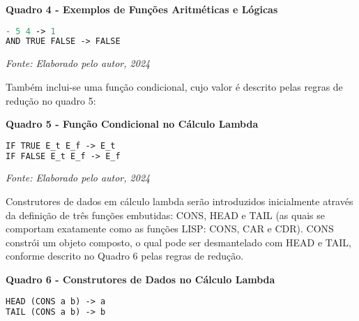 \begin{center}
    \textbf{Quadro 4 - Exemplos de Funções Aritméticas e Lógicas}
\end{center}


\begin{tcolorbox}[colback=gray!5!white, colframe=gray!75!black, title=]
\begin{lstlisting}[language=Lisp]
- 5 4 -> 1
AND TRUE FALSE -> FALSE
\end{lstlisting}
\end{tcolorbox}

\begin{center}
    \textit{Fonte: Elaborado pelo autor, 2024} %
\end{center}

Também inclui-se uma função condicional, cujo valor é descrito pelas regras de redução no quadro 5:

\begin{center}
    \textbf{Quadro 5 - Função Condicional no Cálculo Lambda}
\end{center}

\begin{tcolorbox}[colback=gray!5!white, colframe=gray!75!black, title=]
\begin{lstlisting}[language=Lisp]
IF TRUE E_t E_f -> E_t
IF FALSE E_t E_f -> E_f
\end{lstlisting}
\end{tcolorbox}

\begin{center}
    \textit{Fonte: Elaborado pelo autor, 2024} %
\end{center}


Construtores de dados em cálculo lambda serão introduzidos inicialmente através da definição de três funções embutidas: CONS, HEAD e TAIL (as quais se comportam exatamente como as funções LISP: CONS, CAR e CDR). CONS constrói um objeto composto, o qual pode ser desmantelado com HEAD e TAIL, conforme descrito no Quadro 6 pelas regras de redução.

\begin{center}
    \textbf{Quadro 6 - Construtores de Dados no Cálculo Lambda}
\end{center}

\begin{tcolorbox}[colback=gray!5!white, colframe=gray!75!black, title=]
\begin{lstlisting}[language=Lisp]
HEAD (CONS a b) -> a
TAIL (CONS a b) -> b
\end{lstlisting}
\caption{}
\end{tcolorbox}

